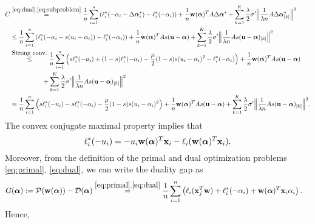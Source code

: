 \documentclass{article}
\newcommand{\N}{n}                               %
\newcommand{\xv}{ {\bf x}}
\newcommand{\uv}{ {\bf u}}
\newcommand{\wv}{ {\bf w}}
\newcommand{\alphav}{ {\boldsymbol \alpha}}
\newcommand{\0}{ {\bf 0}}
\newcommand{\vsubset}[2]{#1_{[#2]}}
\newcommand{\bP}{\mathcal{P}}
\newcommand{\bD}{\mathcal{D}}
\theoremstyle{plain}
\theoremstyle{definition}
\begin{document}
\begin{align*}
C&
\overset{\eqref{eq:dual},
\eqref{eq:subproblem}}{=}
   \frac1n 
 \sum_{i =1}^n 
 \left(
\ell_i^*(-\alpha_i - \Delta \alphav^*_i)
-\ell_i^*(- \alpha_i)
\right)
 +\frac1n  
\wv(\alphav)^T A  \Delta \alphav^*
 + \sum_{k=1}^K 
\frac\lambda2
 \sigma'   \Big\|\frac1{\lambda n} A \vsubset{\Delta \alphav^*}{k}\Big\|^2
\\
&\leq  
   \frac1n 
 \sum_{i =1}^n 
 \left(
\ell_i^*(-\alpha_i - s (u_i - \alpha_i))
-\ell_i^*(- \alpha_i)
\right)
 +\frac1n  
\wv(\alphav)^T A  s (\uv  - \alphav )
 + \sum_{k=1}^K 
\frac\lambda2
 \sigma'   \Big\|\frac1{\lambda n} A \vsubset{s (\uv  - \alphav )}{k}\Big\|^2
\\
&\overset{\mbox{Strong conv.}}{\leq} 
   \frac1n 
 \sum_{i =1}^n 
 \left(
s \ell_i^*(-u_i )
+
(1-s)
\ell_i^*(-\alpha_i )
-
\frac{\mu}{2}
(1-s)s (u_i -\alpha_i)^2
-\ell_i^*(- \alpha_i)
\right)
 +\frac1n  
\wv(\alphav)^T A  s (\uv  - \alphav )
\\& \quad\quad\quad\quad\quad + \sum_{k=1}^K 
\frac\lambda2
 \sigma'   \Big\|\frac1{\lambda n} A \vsubset{s (\uv  - \alphav )}{k}\Big\|^2 
\\
&=
   \frac1n 
 \sum_{i =1}^n 
 \left(
s \ell_i^*(-u_i )
  -s 
\ell_i^*(-\alpha_i )
-
\frac{\mu}{2}
(1-s)s (u_i -\alpha_i)^2
\right)
 +\frac1n  
\wv(\alphav)^T A  s (\uv  - \alphav )
  + \sum_{k=1}^K 
\frac\lambda2
 \sigma'   \Big\|\frac1{\lambda n} A \vsubset{s (\uv  - \alphav )}{k}\Big\|^2.  
\end{align*}
The convex conjugate maximal property implies that
\begin{equation}
\label{eq:adjwofcewa}
\ell_i^*(-u_i)
= -u_i \wv(\alphav)^T \xv_i
  -\ell_i(\wv(\alphav)^T \xv_i).
\end{equation}
Moreover, from the definition of the primal and dual optimization problems \eqref{eq:primal},
\eqref{eq:dual}, we can write the duality gap as
\begin{align}
\label{eq:asdfjiwjfeojawfa}
G(\alphav) := \bP(\wv(\alphav))-\bD(\alphav)
&\overset{
\eqref{eq:primal},
\eqref{eq:dual}
}{=}
 \frac1{\N} 
 \sum_{i=1}^\N
 \left(
  \ell_i( \xv_j^T \wv) 
 +  \ell_i^*(- \alpha_i)
 + \wv(\alphav)^T \xv_i \alpha_i
 \right).  
\end{align}
Hence,
\end{document}
